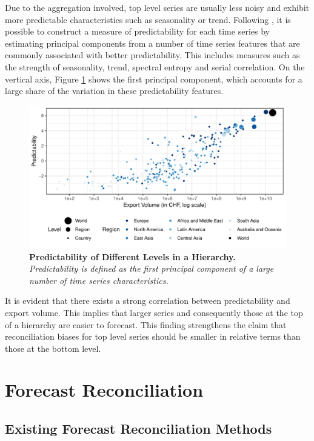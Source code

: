 \documentclass[a4paper,fleqn,11pt]{article}
\begin{document}
Due to the aggregation involved, top level series are usually less noisy and exhibit more predictable characteristics such as seasonality or trend. Following \cite{Kang2017}, it is possible to construct a measure of predictability for each time series by estimating principal components from a number of time series features that are commonly associated with better predictability. This includes measures such as the strength of seasonality, trend, spectral entropy and serial correlation.  On the vertical axis, Figure \ref{fig:feature} shows the first principal component, which accounts for a large share of the variation in these predictability features.
\begin{figure}[H]
	\includegraphics[width=\textwidth]{fig/fig_confetti}
	\caption[Predictability of Different Levels in a Hierarchy]{\textbf{Predictability of Different Levels in a Hierarchy.}\textit{ Predictability is defined as the first principal component of a large number of time series characteristics.}} \label{fig:feature}
\end{figure}
It is evident that there exists a strong correlation between predictability and export volume. This implies that larger series and consequently those at the top of a hierarchy are easier to forecast. This finding strengthens the claim that reconciliation biases for top level series should be smaller in relative terms than those at the bottom level.\\

\section{Forecast Reconciliation}
\label{sec:methods}

\subsection{Existing Forecast Reconciliation Methods}
	
\end{document}
